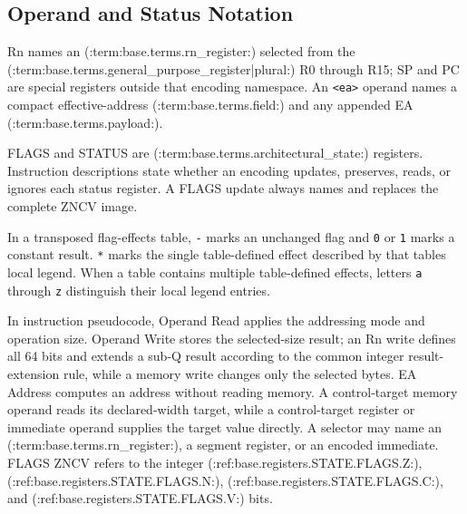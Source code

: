 \subsection*{Operand and Status Notation}
Rn names an (:term:base.terms.rn_register:) selected from the (:term:base.terms.general_purpose_register|plural:) R0 through R15; SP and PC are special registers
outside that encoding namespace. An
\texttt{<ea>} operand names a compact effective-address (:term:base.terms.field:) and any appended EA (:term:base.terms.payload:).

FLAGS and STATUS are (:term:base.terms.architectural_state:) registers. Instruction descriptions state whether an
encoding updates, preserves, reads, or ignores each status register. A FLAGS update always names and replaces the
complete ZNCV image.

In a transposed flag-effects table, \texttt{-} marks an unchanged flag and \texttt{0} or \texttt{1} marks a
constant result. \texttt{*} marks the single table-defined effect described by that table\textquotesingle{}s local legend. When a table
contains multiple table-defined effects, letters \texttt{a} through \texttt{z} distinguish their local legend entries.

In instruction pseudocode, Operand Read applies the addressing mode and operation size. Operand Write stores the
selected-size result; an Rn write defines all 64 bits and extends a sub-Q result according to the common integer
result-extension rule, while a memory write changes only the selected bytes. EA Address
computes an address without reading memory. A control-target memory operand reads its declared-width target, while a
control-target register or immediate operand supplies the target value directly. A selector may name an (:term:base.terms.rn_register:), a
segment register, or an encoded immediate. FLAGS ZNCV refers to the integer (:ref:base.registers.STATE.FLAGS.Z:), (:ref:base.registers.STATE.FLAGS.N:), (:ref:base.registers.STATE.FLAGS.C:), and (:ref:base.registers.STATE.FLAGS.V:) bits.
